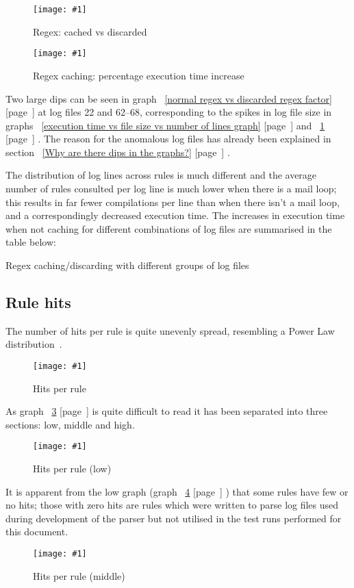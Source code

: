 \documentclass[a4paper,12pt,draft]{article}
\newcommand{\showgraph}[3]{
    \begin{figure}[hbt!]
        \caption{#2}\label{#3}
        \texttt{[image: \#1]}
    \end{figure}
}
\newcommand{\showtable}[3]{
    \begin{table}[ht]
        \caption{#2}\label{#3}
        
    \end{table}
}
\newcommand{\refwithpage}[1]{%
    \empty{}\ref{#1} [page~\pageref{#1}]%
}
\begin{document}
\showgraph{build/plot-cached-discarded.ps}{Regex: cached vs
discarded}{normal regex vs discard regex}

\showgraph{build/plot-cached-discarded-factor.ps}{Regex caching: percentage
execution time increase}{normal regex vs discarded regex factor}

Two large dips can be seen in graph~\refwithpage{normal regex vs discarded
regex factor} at log files 22 and 62--68, corresponding to the spikes in
log file size in graphs~\refwithpage{execution time vs file size vs number
of lines graph} and~\refwithpage{normal regex vs discard regex}.  The
reason for the anomalous log files has already been explained in
section~\refwithpage{Why are there dips in the graphs?}.

The distribution of log lines across rules is much different and the
average number of rules consulted per log line is much lower when there is
a mail loop; this results in far fewer \regex{} compilations per line than
when there isn't a mail loop, and a correspondingly decreased execution
time.  The increases in execution time when not caching \regexs{} for
different combinations of log files are summarised in the table below:

\showtable{build/stats-cached-discarded-include-for-graph}
{Regex caching/discarding with different groups of log files}
{Regex caching/discarding with different groups of log files}


\subsection{Rule hits}
\label{rule hits}

The number of hits per rule is quite unevenly spread, resembling a Power
Law distribution~\cite{powerlaw}.

\showgraph{build/plot-hits.ps}{Hits per rule}{rule hits graph}

As graph~\refwithpage{rule hits graph} is quite difficult to read it has
been separated into three sections: low, middle and high.

\showgraph{build/plot-hits-low.ps}{Hits per rule (low)}{hits per rule low}

It is apparent from the low graph (graph~\refwithpage{hits per rule low})
that some rules have few or no hits; those with zero hits are rules which
were written to parse log files used during development of the parser but
not utilised in the test runs performed for this document.

\showgraph{build/plot-hits-middle.ps}{Hits per rule (middle)}{hits per rule
middle}
\end{document}
